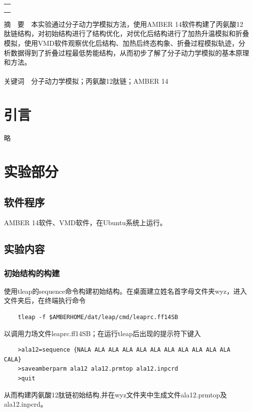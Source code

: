 \documentclass[12pt]{article}
\begin{document}
\begin{titlepage}
\begin{center}
            \begin{tabular*}{\textwidth}{c}
                \\ %
                \\ %
                \\ %
                \\ %
                \hline %
            \end{tabular*}
        \end{center}
        \textsf{摘\ \ 要}\ \ 本实验通过分子动力学模拟方法，使用AMBER 14软件构建了丙氨酸12肽链结构，对初始结构进行了结构优化，对优化后结构进行了加热升温模拟和折叠模拟，使用VMD软件观察优化后结构、加热后终态构象、折叠过程模拟轨迹，分析数据得到了折叠过程最低势能结构，从而初步了解了分子动力学模拟的基本原理和方法。
        \\
        \\
        \textsf{关键词}\ \ 分子动力学模拟；丙氨酸12肽链；AMBER 14
    \end{titlepage}

    \section{引言}
	略
               
\vbox{}        
    \section{实验部分}
    	\subsection{软件程序}
    	AMBER 14软件、VMD软件，在Ubuntu系统上运行。
    	
    	 \subsection{实验内容\citealp{physchemlab}}
			\subsubsection{初始结构的构建}
			使用tleap的sequence命令构建初始结构。在桌面建立姓名首字母文件夹wyz，进入文件夹后，在终端执行命令
\begin{lstlisting}
	tleap -f $AMBERHOME/dat/leap/cmd/leaprc.ff14SB
\end{lstlisting}
以调用力场文件leaprc.ff14SB；在运行tleap后出现的提示符下键入
\begin{lstlisting}
	>ala12=sequence {NALA ALA ALA ALA ALA ALA ALA ALA ALA ALA ALA CALA}
	>saveamberparm ala12 ala12.prmtop ala12.inpcrd
	>quit
\end{lstlisting}
从而构建丙氨酸12肽链初始结构,并在wyz文件夹中生成文件ala12.prmtop及ala12.inpcrd。
	
\end{document}
